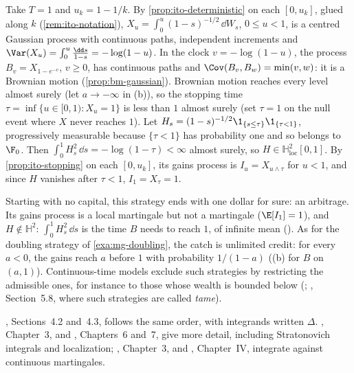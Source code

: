 \begin{example}\label{exa:ito-doubling}
Take $T=1$ and $u_k=1-1/k$. By \cref{prop:ito-deterministic} on each $[0,u_k]$, glued along
$k$ (\cref{rem:ito-notation}), $X_u=\int_0^u(1-s)^{-1/2}\,\dd W_s$, $0\le u<1$, is a centred
Gaussian process with continuous paths, independent increments and
$\Var(X_u)=\int_0^u\frac{\dd s}{1-s}=-\log(1-u)$. In the clock $v=-\log(1-u)$, the process
$B_v=X_{1-e^{-v}}$, $v\ge0$, has continuous paths and $\Cov(B_v,B_w)=\min(v,w)$: it is a
Brownian motion (\cref{prop:bm-gaussian}). Brownian motion reaches every level almost surely
(let $a\to-\infty$ in (b)), so the stopping time $\tau=\inf\{u\in[0,1):X_u=1\}$
is less than $1$ almost surely (set $\tau=1$ on the null event where $X$ never reaches $1$). Let
$H_s=(1-s)^{-1/2}\1_{\{s\le\tau\}}\1_{\{\tau<1\}}$, progressively measurable because
$\{\tau<1\}$ has probability one and so belongs to $\F_0$. Then $\int_0^1H_s^2\,\dd
s=-\log(1-\tau)<\infty$ almost surely, so $H\in\mathbb H^2_{\mathrm{loc}}[0,1]$. By
\cref{prop:ito-stopping} on each $[0,u_k]$, its gains process is $I_u=X_{u\wedge\tau}$ for
$u<1$, and since $H$ vanishes after $\tau<1$, $I_1=X_\tau=1$.

Starting with no capital, this strategy ends with one dollar for sure: an arbitrage. Its gains
process is a local martingale but not a martingale ($\E[I_1]=1$), and $H\notin\mathbb H^2$:
$\int_0^1H_s^2\,\dd s$ is the time $B$ needs to reach $1$, of infinite mean
(). As for the doubling strategy of \cref{exa:mg-doubling}, the catch is
unlimited credit: for every $a<0$, the gains reach $a$ before $1$ with probability $1/(1-a)$
((b) for $B$ on $(a,1)$). Continuous-time models exclude such strategies by
restricting the admissible ones, for instance to those whose wealth is bounded below
(\textcite{harrison-pliska}; \textcite{karatzas-shreve}, Section~5.8, where such strategies are
called \emph{tame}).
\end{example}

\furtherreading
\textcite{shreve2}, Sections~4.2 and~4.3, follows the same order, with integrands written
$\Delta$. \textcite{oksendal}, Chapter~3, and \textcite{steele}, Chapters~6 and~7, give more
detail, including Stratonovich integrals and localization; \textcite{karatzas-shreve},
Chapter~3, and \textcite{revuz-yor}, Chapter~IV, integrate against continuous martingales.
